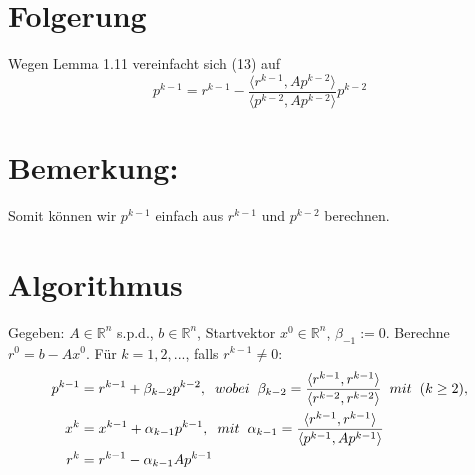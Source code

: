\documentclass{article}
\begin{document}
\section{Folgerung}
Wegen Lemma 1.11 vereinfacht sich (13) auf
\begin{equation*}
p^{k-1} = r^{k-1} - \frac {\langle r^{k-1}, Ap^{k-2} \rangle} {\langle p^{k-2}, Ap^{k-2} \rangle} p^{k-2}
\end{equation*}

\section{Bemerkung:}
Somit können wir $p^{k-1}$ einfach aus $r^{k-1}$ und $p^{k-2}$ berechnen.

\section{Algorithmus}
Gegeben: $A \in \mathbb{R}^{n}$ s.p.d., $b \in \mathbb{R}^{n}$, Startvektor $x^{0} \in \mathbb{R}^{n}$, $\beta_{-1} := 0$. Berechne $r^{0} = b - Ax^{0}$. Für $k = 1,2,...$, falls $r^{k-1} \ne 0$:
\begin{subequations}
\begin{align}
	p^{k-1} &= r^{k-1} + \beta_{k-2}p^{k-2}, \hspace{2mm} wobei \hspace{2mm} \beta_{k-2} = \frac {\langle r^{k-1}, r^{k-1} \rangle} {\langle r^{k-2}, r^{k-2} \rangle} \hspace{2mm} mit \hspace{2mm} (k \ge 2),\\
	x^{k} &= x^{k-1} + \alpha_{k-1}p^{k-1}, \hspace{2mm} mit \hspace{2mm} \alpha_{k-1} = \frac {\langle r^{k-1}, r^{k-1} \rangle} {\langle p^{k-1}, Ap^{k-1} \rangle}\\
	r^{k} &= r^{k-1} - \alpha_{k-1}Ap^{k-1}
\end{align}
\end{subequations}
\end{document}
